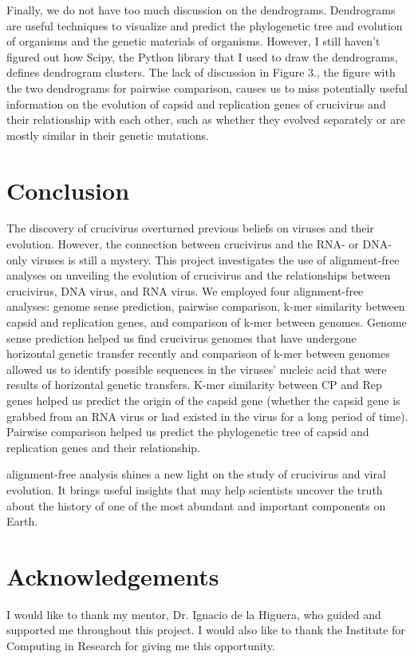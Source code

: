 \documentclass[eng]{ajceam-class}
\begin{document}
Finally, we do not have too much discussion on the dendrograms. Dendrograms are useful techniques to visualize and predict the phylogenetic tree and evolution of organisms and the genetic materials of organisms. However, I still haven't figured out how Scipy, the Python library that I used to draw the dendrograms, defines dendrogram clusters. The lack of discussion in Figure 3., the figure with the two dendrograms for pairwise comparison, causes us to miss potentially useful information on the evolution of capsid and replication genes of crucivirus and their relationship with each other, such as whether they evolved separately or are mostly similar in their genetic mutations. 

\section{Conclusion}
The discovery of crucivirus overturned previous beliefs on viruses and their evolution. However, the connection between crucivirus and the RNA- or DNA-only viruses is still a mystery. This project investigates the use of alignment-free analyses on unveiling the evolution of crucivirus and the relationships between crucivirus, DNA virus, and RNA virus. We employed four alignment-free analyses: genome sense prediction, pairwise comparison, k-mer similarity between capsid and replication genes, and comparison of k-mer between genomes. Genome sense prediction helped us find crucivirus genomes that have undergone horizontal genetic transfer recently and comparison of k-mer between genomes allowed us to identify possible sequences in the viruses' nucleic acid that were results of horizontal genetic transfers. K-mer similarity between CP and Rep genes helped us predict the origin of the capsid gene (whether the capsid gene is grabbed from an RNA virus or had existed in the virus for a long period of time). Pairwise comparison helped us predict the phylogenetic tree of capsid and replication genes and their relationship. 

alignment-free analysis shines a new light on the study of crucivirus and viral evolution. It brings useful insights that may help scientists uncover the truth about the history of one of the most abundant and important components on Earth.

\section{Acknowledgements}
I would like to thank my mentor, Dr. Ignacio de la Higuera, who guided and supported me throughout this project. I would also like to thank the Institute for Computing in Research for giving me this opportunity.
\end{document}
